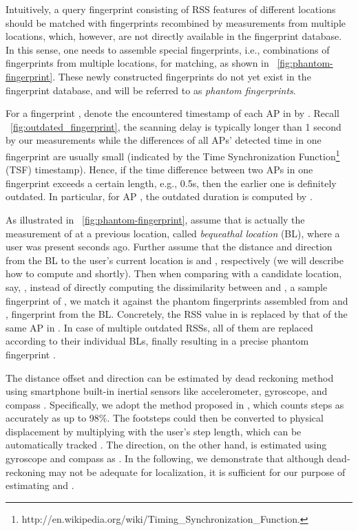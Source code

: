 \documentclass[10pt,conference,compsocconf,letterpaper]{./sty/IEEEtran}
\newcommand{\term}[1]{{\it #1}}
\newcommand{\rev}[1]{{\color{blue}#1}} \newcommand{\com}[1]{\textbf{\color{red}(COMMENT: #1)}} \else
\newcommand{\rev}[1]{#1}
\newcommand{\com}[1]{}
\begin{document}
Intuitively, a query fingerprint consisting of RSS features of different locations should be matched with fingerprints recombined by measurements from multiple locations, which, however, are not directly available in the fingerprint database. In this sense, one needs to assemble special fingerprints, i.e., combinations of fingerprints from multiple locations, for matching, as shown in \figurename~\ref{fig:phantom-fingerprint}. These newly constructed fingerprints do not yet exist in the fingerprint database, and will be referred to as \term{phantom fingerprints}.

For a fingerprint , denote the encountered timestamp of each AP  in  by . Recall \figurename~\ref{fig:outdated_fingerprint}, the scanning delay is typically longer than 1 second by our measurements while the differences of all APs' detected time in one fingerprint are usually small (indicated by the Time Synchronization Function\footnote{http://en.wikipedia.org/wiki/Timing\_Synchronization\_Function.} (TSF) timestamp). Hence, if the time difference between two APs in one fingerprint exceeds a certain length, e.g., 0.5s, then the earlier one is definitely outdated. In particular, for AP , the outdated duration  is computed by . 

As illustrated in \figurename~\ref{fig:phantom-fingerprint}, assume that  is actually the measurement of  at a previous location, called \term{bequeathal location} (BL), where a user was present  seconds ago. Further assume that the distance and direction from the BL to the user's current location is  and , respectively (we will describe how to compute  and  shortly). Then when comparing  with a candidate location, say, , instead of directly computing the dissimilarity between  and , a sample fingerprint of , we match it against the phantom fingerprints  assembled from  and ,  fingerprint from the BL. Concretely, the RSS value  in  is replaced by that of the same AP in . In case of multiple outdated RSSs, all of them are replaced according to their individual BLs, finally resulting in a precise phantom fingerprint .

The distance offset  and direction  can be estimated by dead reckoning method using smartphone built-in inertial sensors like accelerometer, gyroscope, and compass \cite{constandache_towards_2010, wang_no_2012, rai_zee_2012, shen2013walkie}. Specifically, we adopt the method proposed in \cite{wu2013footprints}, which counts steps as accurately as up to 98\%. The footsteps could then be converted to physical displacement by multiplying with the user's step length, which can be automatically tracked \cite{rai_zee_2012}. The direction, on the other hand, is estimated using gyroscope and compass as \cite{rai_zee_2012}. In the following, we demonstrate that although dead-reckoning may not be adequate for localization, it is sufficient for \rev{our purpose of estimating  and }. 
\end{document}
